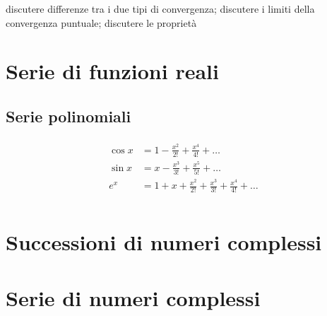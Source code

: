 \documentclass[letterpaper,10pt,italian]{jupyterBook}
\begin{document}
\sphinxAtStartPar
{} discutere differenze tra i due tipi di convergenza; discutere i limiti della convergenza puntuale; discutere le proprietà


\section{Serie di funzioni reali}
\label{\detokenize{ch/series:serie-di-funzioni-reali}}\label{\detokenize{ch/series:math-hs-series-fun-series}}

\subsection{Serie polinomiali}
\label{\detokenize{ch/series:serie-polinomiali}}
\sphinxAtStartPar
{} 
\begin{equation*}
\begin{split}\begin{aligned}
   \cos x & = 1 - \frac{x^2}{2!} + \frac{x^4}{4!} + \dots \\
   \sin x & = x - \frac{x^3}{3!} + \frac{x^5}{5!} + \dots \\
   e^x    & = 1 + x + \frac{x^2}{2!} + \frac{x^3}{3!} + \frac{x^4}{4!} + \dots \\
\end{aligned}\end{split}
\end{equation*}
\sphinxAtStartPar
{} 


\section{Successioni di numeri complessi}
\label{\detokenize{ch/series:successioni-di-numeri-complessi}}\label{\detokenize{ch/series:math-hs-series-complex-sequences}}\label{\detokenize{ch/series:math-hs-series-complex-series}}
\sphinxAtStartPar
{} 


\section{Serie di numeri complessi}
\label{\detokenize{ch/series:serie-di-numeri-complessi}}
\sphinxAtStartPar
{} 
\end{document}
